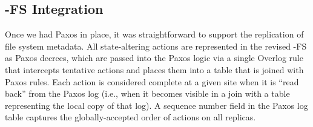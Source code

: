 
\subsection{\BOOM-FS Integration}
\label{sec:paxos-integration}
Once we had Paxos in place, it was straightforward to support the replication of
file system metadata. All state-altering actions are represented in the revised
\BOOM-FS as Paxos decrees, which are passed into the Paxos logic via a single
Overlog rule that intercepts tentative actions and places them into a table that
is joined with Paxos rules. Each action is considered complete at a given site
when it is ``read back'' from the Paxos log (i.e., when it becomes visible in a
join with a table representing the local copy of that log). A sequence number
field in the Paxos log table captures the globally-accepted order of actions on
all replicas.


